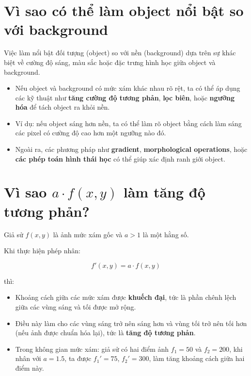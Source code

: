 \documentclass[12pt]{article}
\begin{document}
	\section{Vì sao có thể làm object nổi bật so với background}
	Việc làm nổi bật đối tượng (object) so với nền (background) dựa trên sự khác biệt về cường độ sáng, màu sắc hoặc đặc trưng hình học giữa object và background.
	
	\begin{itemize}
		\item Nếu object và background có mức xám khác nhau rõ rệt, ta có thể áp dụng các kỹ thuật như \textbf{tăng cường độ tương phản}, \textbf{lọc biên}, hoặc \textbf{ngưỡng hóa} để tách object ra khỏi nền.
		
		\item Ví dụ: nếu object sáng hơn nền, ta có thể làm rõ object bằng cách làm sáng các pixel có cường độ cao hơn một ngưỡng nào đó.
		
		\item Ngoài ra, các phương pháp như \textbf{gradient}, \textbf{morphological operations}, hoặc \textbf{các phép toán hình thái học} có thể giúp xác định ranh giới object.
	\end{itemize}
	
	\section{ Vì sao \texorpdfstring{$a \cdot f(x,y)$}{} làm tăng độ tương phản?}
	
	Giả sử \( f(x, y) \) là ảnh mức xám gốc và \( a > 1 \) là một hằng số.
	
	Khi thực hiện phép nhân:
	
	\[
	f'(x, y) = a \cdot f(x, y)
	\]
	
	thì:
	
	\begin{itemize}
		\item Khoảng cách giữa các mức xám được \textbf{khuếch đại}, tức là phần chênh lệch giữa các vùng sáng và tối được mở rộng.
		\item Điều này làm cho các vùng sáng trở nên sáng hơn và vùng tối trở nên tối hơn (nếu ảnh được chuẩn hóa lại), tức là \textbf{tăng độ tương phản}.
		\item Trong không gian mức xám: giả sử có hai điểm ảnh \( f_1 = 50 \) và \( f_2 = 200 \), khi nhân với \( a = 1.5 \), ta được \( f_1' = 75 \), \( f_2' = 300 \), làm tăng khoảng cách giữa hai điểm này.
	\end{itemize}
	
\end{document}
